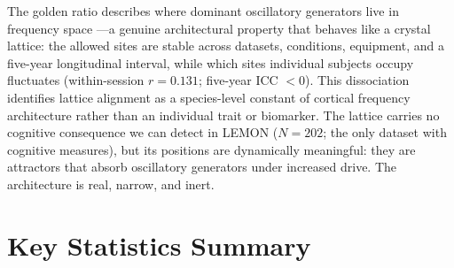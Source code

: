 \documentclass[11pt,a4paper]{article}
\begin{document}
The golden ratio describes where dominant oscillatory generators live in frequency space \parencite{Buzsaki2004, Penttonen2003, Pletzer2010}---a genuine architectural property that behaves like a crystal lattice: the allowed sites are stable across datasets, conditions, equipment, and a five-year longitudinal interval, while which sites individual subjects occupy fluctuates (within-session $r = 0.131$; five-year ICC $< 0$). This dissociation identifies lattice alignment as a species-level constant of cortical frequency architecture rather than an individual trait or biomarker. The lattice carries no cognitive consequence we can detect in LEMON ($N = 202$; the only dataset with cognitive measures), but its positions are dynamically meaningful: they are attractors that absorb oscillatory generators under increased drive. The architecture is real, narrow, and inert.

\section{Key Statistics Summary}
\end{document}
